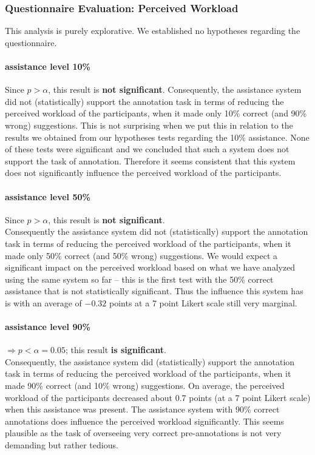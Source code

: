 	\subsubsection{Questionnaire Evaluation: Perceived Workload}
		This analysis is purely explorative. We established no hypotheses regarding the questionnaire.

		\paragraph{assistance level 10\%}
		Since \(p > \alpha\), this result is \textbf{not significant}.
		Consequently, the assistance system did not (statistically) support the annotation task in terms of reducing the perceived workload of the participants, when it made only 10\% correct (and 90\% wrong) suggestions. This is not surprising when we put this in relation to the results we obtained from our hypotheses tests regarding the 10\% assistance. None of these tests were significant and we concluded that such a system does not support the task of annotation. Therefore it seems consistent that this system does not significantly influence the perceived workload of the participants.

		\paragraph{assistance level 50\%}
		Since \(p > \alpha\), this result is \textbf{not significant}.\\
		Consequently the assistance system did not (statistically) support the annotation task in terms of reducing the perceived workload of the participants, when it made only 50\% correct (and 50\% wrong) suggestions. We would expect a significant impact on the perceived workload based on what we have analyzed using the same system so far -- this is the first test with the 50\% correct assistance that is not statistically significant. Thus the influence this system has is with an average of $-0.32$ points at a 7 point Likert scale still very marginal.
		\vspace{0.5cm}

		\paragraph{assistance level 90\%}
		\(\Rightarrow p < \alpha = 0.05\); this result \textbf{is significant}.\\
		Consequently, the assistance system did (statistically) support the annotation task in terms of reducing the perceived workload of the participants, when it made 90\% correct (and 10\% wrong) suggestions. On average, the perceived workload of the participants decreased about 0.7 points (at a 7 point Likert scale) when this assistance was present. The assistance system with 90\% correct annotations does influence the perceived workload significantly. This seems plausible as the task of overseeing very correct pre-annotations is not very demanding but rather tedious.

